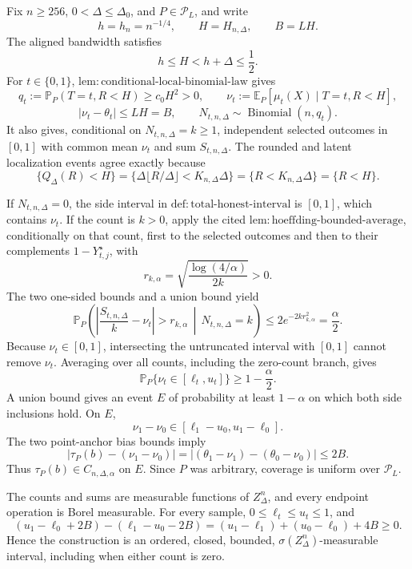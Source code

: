 Fix \(n\geq256\), \(0<\Delta\leq\Delta_0\), and \(P\in\mathcal P_L\), and write
\[
 h=h_n=n^{-1/4},\qquad H=H_{n,\Delta},\qquad B=LH.
\]
The aligned bandwidth satisfies
\[
 h\leq H<h+\Delta\leq\frac12.
\]
For \(t\in\{0,1\}\), \(\mathrm{lem:conditional\text{-}local\text{-}binomial\text{-}law}\) gives
\[
 q_t:=\mathbb P_P(T=t,R<H)\geq c_0H^2>0,
 \qquad
 \nu_t:=\mathbb E_P[\mu_t(X)\mid T=t,R<H],
\]
\[
 |\nu_t-\theta_t|\leq LH=B,
 \qquad
 N_{t,n,\Delta}\sim\operatorname{Binomial}(n,q_t).
\]
It also gives, conditional on \(N_{t,n,\Delta}=k\geq1\), independent selected outcomes in \([0,1]\) with common mean \(\nu_t\) and sum \(S_{t,n,\Delta}\).  The rounded and latent localization events agree exactly because
\[
 \{Q_\Delta(R)<H\}
 =\{\Delta\lfloor R/\Delta\rfloor<K_{n,\Delta}\Delta\}
 =\{R<K_{n,\Delta}\Delta\}
 =\{R<H\}.
\]

If \(N_{t,n,\Delta}=0\), the side interval in \(\mathrm{def:total\text{-}honest\text{-}interval}\) is \([0,1]\), which contains \(\nu_t\).  If the count is \(k>0\), apply the cited \(\mathrm{lem:hoeffding\text{-}bounded\text{-}average}\), conditionally on that count, first to the selected outcomes and then to their complements \(1-Y_{t,j}^{\star}\), with
\[
 r_{k,\alpha}=\sqrt{\frac{\log(4/\alpha)}{2k}}>0.
\]
The two one-sided bounds and a union bound yield
\[
 \mathbb P_P\!\left(\left|\frac{S_{t,n,\Delta}}k-\nu_t\right|>r_{k,\alpha}\,\middle|\,N_{t,n,\Delta}=k\right)
 \leq2e^{-2kr_{k,\alpha}^2}=\frac\alpha2.
\]
Because \(\nu_t\in[0,1]\), intersecting the untruncated interval with \([0,1]\) cannot remove \(\nu_t\).  Averaging over all counts, including the zero-count branch, gives
\[
 \mathbb P_P\{\nu_t\in[\ell_t,u_t]\}\geq1-\frac\alpha2.
\]
A union bound gives an event \(E\) of probability at least \(1-\alpha\) on which both side inclusions hold.  On \(E\),
\[
 \nu_1-\nu_0\in[\ell_1-u_0,u_1-\ell_0].
\]
The two point-anchor bias bounds imply
\[
 |\tau_P(b)-(\nu_1-\nu_0)|
 =| (\theta_1-\nu_1)-(\theta_0-\nu_0)|
 \leq2B.
\]
Thus \(\tau_P(b)\in C_{n,\Delta,\alpha}\) on \(E\).  Since \(P\) was arbitrary, coverage is uniform over \(\mathcal P_L\).

The counts and sums are measurable functions of \(Z_\Delta^n\), and every endpoint operation is Borel measurable.  For every sample, \(0\leq\ell_t\leq u_t\leq1\), and
\[
 (u_1-\ell_0+2B)-(\ell_1-u_0-2B)
 =(u_1-\ell_1)+(u_0-\ell_0)+4B\geq0.
\]
Hence the construction is an ordered, closed, bounded, \(\sigma(Z_\Delta^n)\)-measurable interval, including when either count is zero.

